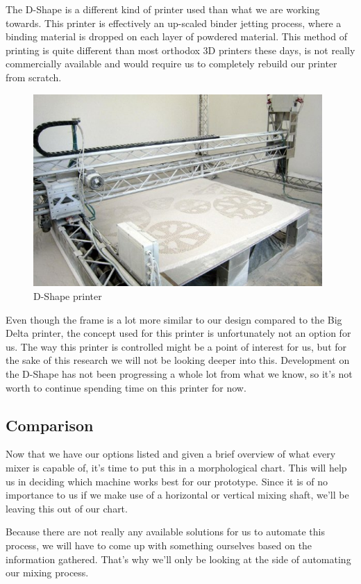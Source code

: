 \documentclass[12pt, a4paper]{article}
\begin{document}
The D-Shape is a different kind of printer used than what we are working towards. This printer is effectively an up-scaled binder jetting process, where a binding material is dropped on each layer of powdered material. This method of printing is quite different than most orthodox 3D printers these days, is not really commercially available and would require us to completely rebuild our printer from scratch.
\begin{figure}[H]
	\centering
	\includegraphics[width=11cm, keepaspectratio]{dshape}
	\caption{D-Shape printer}
\end{figure}

Even though the frame is a lot more similar to our design compared to the Big Delta printer, the concept used for this printer is unfortunately not an option for us. The way this printer is controlled might be a point of interest for us, but for the sake of this research we will not be looking deeper into this. Development on the D-Shape has not been progressing a whole lot from what we know, so it's not worth to continue spending time on this printer for now.
	\newpage

\subsection{Comparison}
Now that we have our options listed and given a brief overview of what every mixer is capable of, it's time to put this in a morphological chart. This will help us in deciding which machine works best for our prototype. Since it is of no importance to us if we make use of a horizontal or vertical mixing shaft, we'll be leaving this out of our chart.

Because there are not really any available solutions for us to automate this process, we will have to come up with something ourselves based on the information gathered. That's why we'll only be looking at the side of automating our mixing process.
\end{document}
